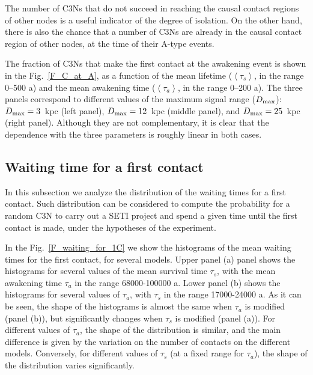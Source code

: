 \documentclass[crop]{CSLB}
\newcommand{\ceti}{C3N}
\newcommand{\cetis}{C3Ns}
\newcommand{\ffn}[1]{}
\begin{document}
The number of \cetis{} that do not succeed in reaching the
causal contact regions of other nodes is a useful indicator of
the
degree of isolation.
%
On the other hand, there is also the chance that a number of
\cetis{} are already in the causal contact region of other nodes,
at the time of their A-type events.
%
\ffn{5}
%
The fraction of \cetis{} that make the first contact at the awakening
event is shown in the Fig.~\ref{F_C_at_A}, 
as a function of the mean lifetime
($\left<\tau_s\right>$, in the range 0--500 a) and the mean awakening
time ($\left<\tau_a\right>$, in the range 0--200 a).
%
The three panels correspond to different values of the maximum signal
range ($D_{\rm max}$):
%
$D_{\rm max}=3$~kpc (left
panel), $D_{\rm max}=12$~kpc (middle panel), and $D_{\rm max}=25$~kpc
(right panel).
%
Although they are not complementary, it is clear that the dependence
with the three parameters is roughly linear in both cases.
%


\subsection{Waiting time for a first contact}\label{SS_waiting}

In this subsection we analyze the distribution of the waiting times for
a first contact.
%
Such distribution can be considered to compute the probability for a
random \ceti{} to carry out a SETI project and spend a given time until
the first contact is made, under the hypotheses of the experiment.
%
\ffn{6}
%
In the Fig.~\ref{F_waiting_for_1C} we show the histograms of the mean
waiting times for the first contact, for several models.
%
Upper panel (a) panel shows the histograms for several values of the
mean survival time $\tau_s$, with the mean awakening time $\tau_a$ in
the range 68000-100000 a.
%
Lower panel (b) shows the histograms for several values of $\tau_a$,
with $\tau_s$ in the range 17000-24000 a.
%
As it can be seen, the shape of the histograms is almost the same when
$\tau_a$ is modified (panel (b)), but significantly changes when
$\tau_s$ is modified (panel (a)). 
%
For different values of $\tau_a$, the shape of the distribution is
similar, and the main difference is given by the variation on the number of
contacts on the different models.
%
Conversely, for different values of $\tau_s$ (at a fixed range for
$\tau_a$), the shape of the
distribution varies significantly.

 
\end{document}
